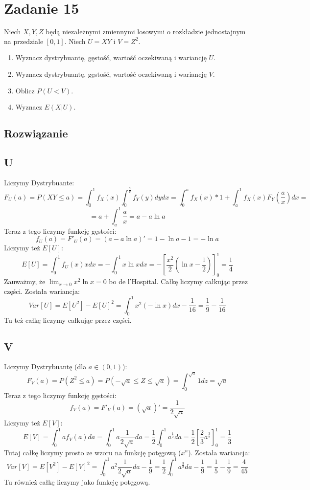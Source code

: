 \section{Zadanie 15}
Niech \(X, Y, Z\) będą niezależnymi zmiennymi losowymi o rozkładzie jednostajnym na przedziale \([0, 1]\). Niech \(U = XY\) i \(V = Z^2\).

\begin{enumerate}[label=(\roman*)]
	\item Wyznacz dystrybuantę, gęstość, wartość oczekiwaną i wariancję \(U\).
	\item Wyznacz dystrybuantę, gęstość, wartość oczekiwaną i wariancję \(V\).
	\item Oblicz \(P(U < V)\).
	\item Wyznacz \(E(X | U)\).
\end{enumerate}

\subsection*{Rozwiązanie}
\subsection{U}
Liczymy Dystrybuante:
\[F_U(a) =P(XY\leq a) = \int_0^1f_X(x)\int^{\frac{a}{x}}_0f_Y(y)dy dx = \int_0^af_X(x)*1+ \int_a^1f_X(x) F_Y(\frac{a}{x}) dx =\]
\[ =a+ \int^1_a \frac{a}{x} =a -a \ln a\]
Teraz z tego liczymy funkcję gęstości:
\[f_U(a) = F'_U(a) = (a-a \ln a)' = 1 - \ln a -1 = -\ln a\]
Liczymy też \(E[U]\):
\[E[U] = \int_0^1 f_U(x)xdx = -\int_0^1 x\ln x dx =-\left[ \frac{x^2}{2} \left( \ln x -\frac{1}{2} \right) \right]_0^1  = \frac{1}{4}\]
Zauważmy, że \(\lim_{x\xrightarrow{ }0}x^2 \ln x =0\) bo de l'Hospital. Całkę liczymy całkując przez części. Została wariancja:
\[Var[U] = E[U^2] - E[U]^2 = \int_0^1x^2(-\ln x) dx - \frac{1}{16} =\frac{1}{9} -  \frac{1}{16}\]
Tu też całkę liczymy całkując przez części.
\subsection{V}
Liczymy Dystrybuantę (dla \(a \in (0,1)\)):
\[F_V(a) = P(Z^2 \leq a) = P(-\sqrt{a} \leq Z \leq \sqrt{a}) = \int_0^{\sqrt{a}} 1 dz = \sqrt{a}\]
Teraz z tego liczymy funkcję gęstości:
\[f_V(a) = F'_V(a) = (\sqrt{a})' = \frac{1}{2\sqrt{a}}\]
Liczymy też \(E[V]\):
\[E[V] = \int_0^1 a f_V(a) da = \int_0^1 a \frac{1}{2\sqrt{a}} da = \frac{1}{2} \int_0^1 a^{\frac{1}{2}} da = \frac{1}{2} \left[ \frac{2}{3}a^{\frac{3}{2}} \right]_0^1 = \frac{1}{3}\]
Tutaj całkę liczymy prosto ze wzoru na funkcję potęgową (\(x^n\)). Została wariancja:
\[Var[V] = E[V^2] - E[V]^2 = \int_0^1 a^2 \frac{1}{2\sqrt{a}} da - \frac{1}{9} = \frac{1}{2} \int_0^1 a^{\frac{3}{2}} da - \frac{1}{9} = \frac{1}{5} - \frac{1}{9} = \frac{4}{45}\]
Tu również całkę liczymy jako funkcję potęgową.

